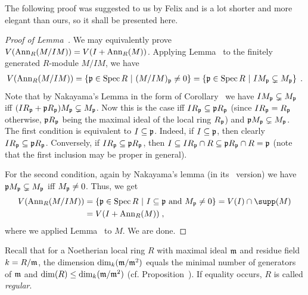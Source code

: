 \documentclass[a4paper,parskip=half,numbers=enddot, DIV=12]{scrreprt}
\begin{document}
The following proof was suggested to us by Felix and is a lot shorter and more elegant than ours, so it shall be presented here.
\begin{proof}[Proof of Lemma~]
	We may equivalently prove $V(\operatorname{Ann}_R(M/IM))=V(I+\operatorname{Ann}_R(M))$. Applying  Lemma~ to the finitely generated $R$-module $M/IM$, we have
	\begin{align*}
		V(\operatorname{Ann}_R(M/IM))=\left\{\mathfrak{p}\in\operatorname{Spec} R\ \middle|\  (M/IM)_{\mathfrak{p}}\neq 0\right\}=\left\{\mathfrak{p}\in\operatorname{Spec} R\ \middle|\  IM_{\mathfrak{p}}\subsetneq M_{\mathfrak{p}}\right\}\;.
	\end{align*}
	Note that by Nakayama's Lemma in the form of Corollary~ we have $IM_{\mathfrak{p}}\subsetneq M_{\mathfrak{p}}$ iff $(IR_{\mathfrak{p}}+\mathfrak{p} R_{\mathfrak{p}})M_{\mathfrak{p}}\subsetneq M_{\mathfrak{p}}$. Now this is the case iff $IR_{\mathfrak{p}}\subseteq \mathfrak{p} R_{\mathfrak{p}}$ (since $IR_{\mathfrak{p}}=R_{\mathfrak{p}}$ otherwise, $\mathfrak{p} R_{\mathfrak{p}}$ being the maximal ideal of the local ring $R_{\mathfrak{p}}$) and $\mathfrak{p} M_{\mathfrak{p}}\subsetneq M_{\mathfrak{p}}$. The first condition is equivalent to $I\subseteq \mathfrak{p}$. Indeed, if $I\subseteq \mathfrak{p}$, then clearly $IR_{\mathfrak{p}}\subseteq \mathfrak{p} R_{\mathfrak{p}}$. Conversely, if $IR_{\mathfrak{p}}\subseteq \mathfrak{p} R_{\mathfrak{p}}$, then $I\subseteq IR_{\mathfrak{p}}\cap R\subseteq\mathfrak{p} R_{\mathfrak{p}}\cap R=\mathfrak{p}$ (note that the first inclusion may be proper in general).
	
	For the second condition, again by Nakayama's lemma (in its \NAK\ version) we have $\mathfrak{p} M_{\mathfrak{p}}\subsetneq M_{\mathfrak{p}}$ iff $M_{\mathfrak{p}}\neq 0$. Thus, we get
	\begin{align*}
		V(\Ann_R(M/IM))&=\left\{\pp\in \Spec R\st I\subseteq \pp \text{ and }M_\pp\neq 0\right\}=V(I)\cap \supp(M)\\
		&=V(I+\Ann_R(M))\;,
	\end{align*}
	where we applied Lemma~ to $M$. We are done.
\end{proof}
 Recall that for a Noetherian local ring $R$ with maximal ideal $\mathfrak{m}$ and residue field $k=R/\mathfrak{m}$, the dimension $\dim_k(\mathfrak{m}/\mathfrak{m}^2)$ equals the minimal number of generators of $\mathfrak{m}$ and $\dim(R) \leq \dim_k(\mathfrak{m}/\mathfrak{m}^2)$ (cf. Proposition~). If equality occurs, $R$ is called \emph{regular}.
\end{document}
